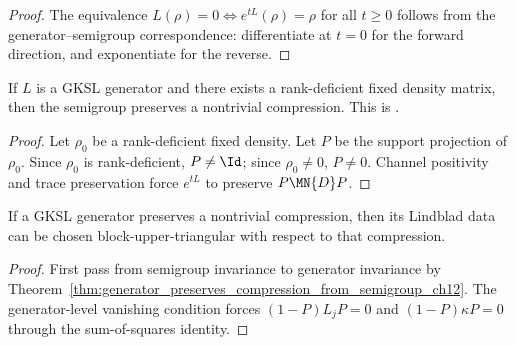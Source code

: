 \begin{proof}\leanok
    The equivalence $L(\rho) = 0 \iff e^{tL}(\rho) = \rho$ for all $t \ge 0$
    follows from the generator--semigroup correspondence: differentiate
    at $t=0$ for the forward direction, and exponentiate for the reverse.
\end{proof}

\begin{theorem}
    \label{thm:wolf_prop_7_6_one_implies_three}
    \leanok
    If $L$ is a GKSL generator and there exists a rank-deficient fixed
    density matrix, then the semigroup preserves a nontrivial compression.
    This is \cite[Proposition~7.6, (1)$\Rightarrow$(3)]{Wolf2012Quantum}.
\end{theorem}

\begin{proof}\leanok
    Let $\rho_0$ be a rank-deficient fixed density.
    Let $P$ be the support projection of $\rho_0$.
    Since $\rho_0$ is rank-deficient, $P \neq \Id$;
    since $\rho_0 \neq 0$, $P \neq 0$.
    Channel positivity and trace preservation force $e^{tL}$ to
    preserve $P \MN{D} P$.
\end{proof}

\begin{theorem}
    \label{thm:hasBlockUpperTriangularLindblad_of_hasInvariantCompression_ch12}
    \leanok
    If a GKSL generator preserves a nontrivial compression, then its Lindblad data can be chosen
    block-upper-triangular with respect to that compression.
\end{theorem}

\begin{proof}
    \leanok
    First pass from semigroup invariance to generator invariance by
    Theorem~\ref{thm:generator_preserves_compression_from_semigroup_ch12}. The generator-level
    vanishing condition forces $(1-P)L_jP = 0$ and $(1-P)\kappa P = 0$ through the sum-of-squares
    identity.
\end{proof}

